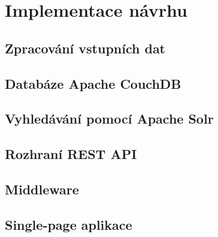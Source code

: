 
\chapter{Implementace návrhu}


\section{Zpracování vstupních dat}


\section{Databáze Apache CouchDB}


\section{Vyhledávání pomocí Apache Solr}


\section{Rozhraní REST API}


\section{Middleware}


\section{Single-page aplikace}